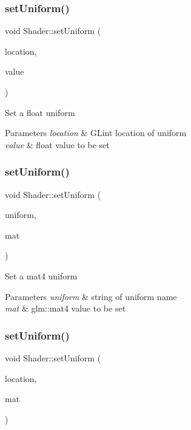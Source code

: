 \subsubsection{\texorpdfstring{setUniform()}{setUniform()}\hspace{0.1cm}{\footnotesize\ttfamily [6/10]}}
{\footnotesize\ttfamily void Shader\+::set\+Uniform (\begin{DoxyParamCaption}\item[{G\+Lint}]{location,  }\item[{const float}]{value }\end{DoxyParamCaption})}

Set a float uniform


\begin{DoxyParams}{Parameters}
{\em location} & G\+Lint location of uniform \\
\hline
{\em value} & float value to be set \\
\hline
\end{DoxyParams}
\mbox{\label{class_shader_a500fce8b6eba1eaa28b6f5bc62bcf9fd}} 
\subsubsection{\texorpdfstring{setUniform()}{setUniform()}\hspace{0.1cm}{\footnotesize\ttfamily [7/10]}}
{\footnotesize\ttfamily void Shader\+::set\+Uniform (\begin{DoxyParamCaption}\item[{std\+::string}]{uniform,  }\item[{const glm\+::mat4 \&}]{mat }\end{DoxyParamCaption})}

Set a mat4 uniform


\begin{DoxyParams}{Parameters}
{\em uniform} & string of uniform name \\
\hline
{\em mat} & glm\+::mat4 value to be set \\
\hline
\end{DoxyParams}
\mbox{\label{class_shader_a46355ed56b88314db5d718d4a62d35c8}} 
\subsubsection{\texorpdfstring{setUniform()}{setUniform()}\hspace{0.1cm}{\footnotesize\ttfamily [8/10]}}
{\footnotesize\ttfamily void Shader\+::set\+Uniform (\begin{DoxyParamCaption}\item[{G\+Lint}]{location,  }\item[{const glm\+::mat4 \&}]{mat }\end{DoxyParamCaption})}

